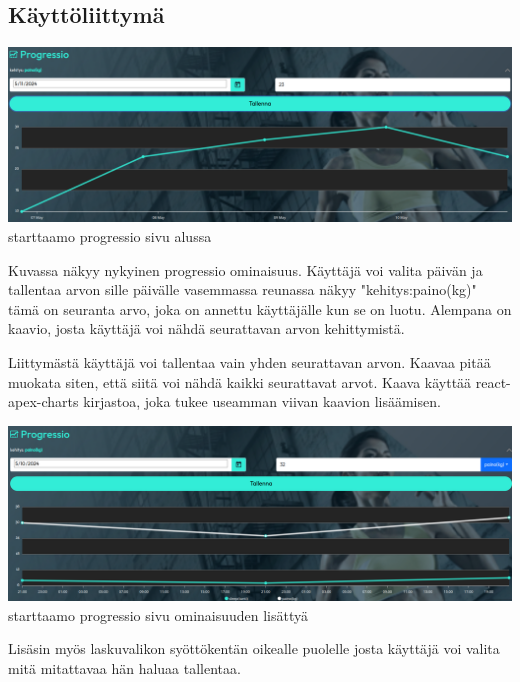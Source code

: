 \subsection*{Käyttöliittymä}



\includegraphics[width= 15cm]{src/public/progressiosingle.png} \\
starttaamo progressio sivu alussa
\medskip

Kuvassa näkyy nykyinen progressio ominaisuus. Käyttäjä voi valita päivän ja tallentaa arvon sille päivälle
vasemmassa reunassa näkyy "kehitys:paino(kg)"{} tämä on seuranta arvo, joka on annettu käyttäjälle kun se on luotu.
Alempana on kaavio, josta käyttäjä voi nähdä seurattavan arvon kehittymistä. 
\medskip


Liittymästä käyttäjä voi tallentaa vain yhden seurattavan arvon. 
Kaavaa pitää muokata siten, että siitä voi nähdä kaikki seurattavat arvot.
Kaava käyttää react-apex-charts kirjastoa, joka tukee useamman viivan kaavion lisäämisen.
\medskip



\includegraphics[width= 15cm]{src/public/progressmulti.png} \\
starttaamo progressio sivu ominaisuuden lisättyä
\medskip


Lisäsin myös laskuvalikon syöttökentän oikealle puolelle josta käyttäjä voi valita mitä mitattavaa hän haluaa tallentaa.

